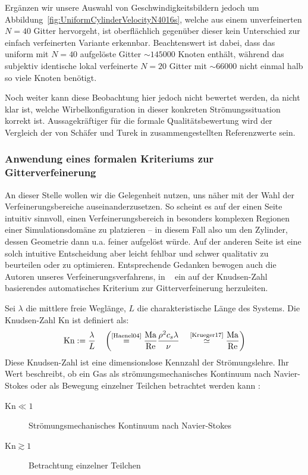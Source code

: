 Ergänzen wir unsere Auswahl von Geschwindigkeitsbildern jedoch um Abbildung~\ref{fig:UniformCylinderVelocityN4016s}, welche aus einem unverfeinerten \(N=40\) Gitter hervorgeht, ist oberflächlich gegenüber dieser kein Unterschied zur einfach verfeinerten Variante erkennbar. Beachtenswert ist dabei, dass das uniform mit \(N=40\) aufgelöste Gitter \(\sim 145000\) Knoten enthält, während das subjektiv identische lokal verfeinerte \(N=20\) Gitter mit \(\sim 66000\) nicht einmal halb so viele Knoten benötigt.

\bigskip

Noch weiter kann diese Beobachtung hier jedoch nicht bewertet werden, da nicht klar ist, welche Wirbelkonfiguration in dieser konkreten Strömungssituation korrekt ist. Aussagekräftiger für die formale Qualitätsbewertung wird der Vergleich der von Schäfer und Turek in \cite{SchaeferTurek96} zusammengestellten Referenzwerte sein.

\subsubsection{Anwendung eines formalen Kriteriums zur Gitterverfeinerung}

An dieser Stelle wollen wir die Gelegenheit nutzen, uns näher mit der Wahl der Verfeinerungsbereiche auseinanderzusetzen. So scheint es auf der einen Seite intuitiv sinnvoll, einen Verfeinerungsbereich in besonders komplexen Regionen einer Simulationsdomäne zu platzieren -- in diesem Fall also um den Zylinder, dessen Geometrie dann u.a. feiner aufgelöst würde. Auf der anderen Seite ist eine solch intuitive Entscheidung aber leicht fehlbar und schwer qualitativ zu beurteilen oder zu optimieren. Entsprechende Gedanken bewogen auch die Autoren unseres Verfeinerungsverfahrens, in ~\cite{Lagrava15} ein auf der Knudsen-Zahl basierendes automatisches Kriterium zur Gitterverfeinerung herzuleiten.

\begin{Definition}
Sei \(\lambda\) die mittlere freie Weglänge, \(L\) die charakteristische Länge des Systems. Die Knudsen-Zahl \(\text{Kn}\) ist definiert als:
\[ \text{Kn} := \frac{\lambda}{L} \quad \left(\overset{\text{\cite[Kap.~1.4.2]{Haenel04}}}{=} \frac{\text{Ma}}{\text{Re}} \frac{\rho^2 c_s \lambda}{\nu} \quad \overset{\text{\cite[Gl.~(7.22)]{Krueger17}}}{\simeq} \frac{\text{Ma}}{\text{Re}}\right) \]
Diese Knudsen-Zahl ist eine dimensionslose Kennzahl der Strömungslehre. Ihr Wert beschreibt, ob ein Gas als strömungsmechanisches Kontinuum nach Navier-Stokes oder als Bewegung einzelner Teilchen betrachtet werden kann \cite[S.~14]{Krueger17}:
\begin{description}
\item[\(\text{Kn} \ll 1\)] Strömungsmechanisches Kontinuum nach Navier-Stokes
\item[\(\text{Kn} \gtrsim 1\)] Betrachtung einzelner Teilchen
\end{description}
\end{Definition}

